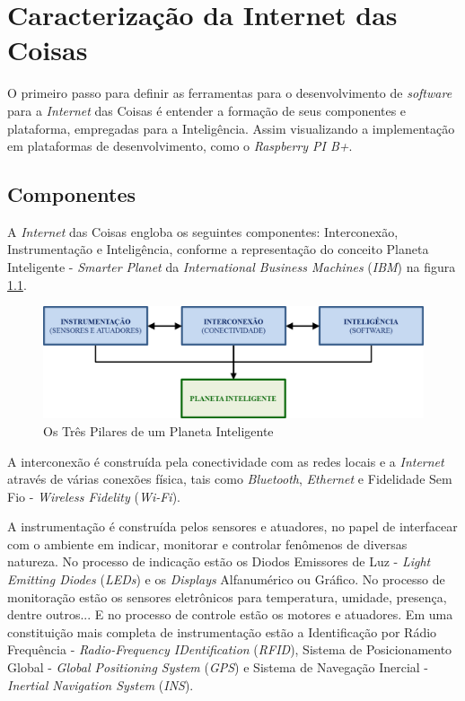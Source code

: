 %

\chapter{Caracterização da Internet das Coisas}

O primeiro passo para definir as ferramentas para o desenvolvimento 
de \textit{software} para a \textit{Internet} das Coisas é entender a formação 
de seus componentes e plataforma, empregadas para a Inteligência. Assim 
visualizando a implementação em plataformas de desenvolvimento, como o 
\textit{Raspberry PI B+}.

\section{Componentes}

A \textit{Internet} das Coisas engloba os seguintes componentes: Interconexão, 
Instrumentação e Inteligência, conforme a representação do conceito Planeta 
Inteligente - \textit{Smarter Planet} da \textit{International Business 
Machines} (\textit{IBM}) na figura \ref{fig:pilares-da-iot}.

\begin{figure}[H]
    \centering
    \includegraphics[width=0.7\linewidth]{figuras/pilares-da-iot}
    \caption{Os Três Pilares de um Planeta Inteligente}
    \label{fig:pilares-da-iot}
\end{figure}

A interconexão é construída pela conectividade com as redes locais e a 
\textit{Internet} através de várias conexões física, tais como 
\textit{Bluetooth}, \textit{Ethernet} e Fidelidade Sem Fio - \textit{Wireless 
Fidelity} (\textit{Wi-Fi}).

A instrumentação é construída pelos sensores e atuadores, no papel de 
interfacear com o ambiente em indicar, monitorar e controlar fenômenos de 
diversas natureza. No processo de indicação estão os Diodos Emissores de Luz - 
\textit{Light Emitting Diodes} (\textit{LEDs}) e os \textit{Displays} 
Alfanumérico ou Gráfico. No processo de monitoração estão os sensores 
eletrônicos para temperatura, umidade, presença, dentre outros... E no processo 
de controle estão os motores e atuadores. Em uma constituição mais completa de 
instrumentação estão a Identificação por Rádio Frequência - 
\textit{Radio-Frequency IDentification} (\textit{RFID}), Sistema de 
Posicionamento Global - \textit{Global Positioning System} (\textit{GPS}) e 
Sistema de Navegação Inercial - \textit{Inertial Navigation System} 
(\textit{INS}).

